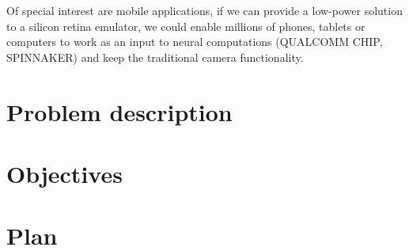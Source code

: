 Of special interest are mobile applications, if we can provide a low-power solution to a silicon retina emulator, we could enable millions of phones, tablets or computers to work as an input to neural computations (QUALCOMM CHIP, SPINNAKER) and keep the traditional camera functionality.

\section{Problem description}
\label{sec:intro:problem}


\section{Objectives}
\label{sec:intro:objectives}

\section{Plan}
\label{sec:intro:plan}

